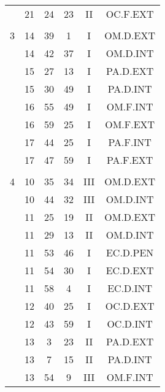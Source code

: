 \documentclass[12pt, a4paper]{article}
\begin{document}
\begin{multicols}{3}
{\begin{tabular}{c c c c c c}
	 	 	 	 & 21 & 24 & 23 & II & OC.F.EXT\\%
	 	 	 	 & & & & & \\%
	 	 	 	3 & 14 & 39 & 1 & I & OM.D.EXT\\%
	 	 	 	 & 14 & 42 & 37 & I & OM.D.INT\\%
	 	 	 	 & 15 & 27 & 13 & I & PA.D.EXT\\%
	 	 	 	 & 15 & 30 & 49 & I & PA.D.INT\\%
	 	 	 	 & 16 & 55 & 49 & I & OM.F.INT\\%
	 	 	 	 & 16 & 59 & 25 & I & OM.F.EXT\\%
	 	 	 	 & 17 & 44 & 25 & I & PA.F.INT\\%
	 	 	 	 & 17 & 47 & 59 & I & PA.F.EXT\\%
	 	 	 	 & & & & & \\%
	 	 	 	4 & 10 & 35 & 34 & III & OM.D.EXT\\%
	 	 	 	 & 10 & 44 & 32 & III & OM.D.INT\\%
	 	 	 	 & 11 & 25 & 19 & II & OM.D.EXT\\%
	 	 	 	 & 11 & 29 & 13 & II & OM.D.INT\\%
	 	 	 	 & 11 & 53 & 46 & I & EC.D.PEN\\%
	 	 	 	 & 11 & 54 & 30 & I & EC.D.EXT\\%
	 	 	 	 & 11 & 58 & 4 & I & EC.D.INT\\%
	 	 	 	 & 12 & 40 & 25 & I & OC.D.EXT\\%
	 	 	 	 & 12 & 43 & 59 & I & OC.D.INT\\%
	 	 	 	 & 13 & 3 & 23 & II & PA.D.EXT\\%
	 	 	 	 & 13 & 7 & 15 & II & PA.D.INT\\%
	 	 	 	 & 13 & 54 & 9 & III & OM.F.INT\\%

\end{tabular}}
\end{multicols}
\end{document}
